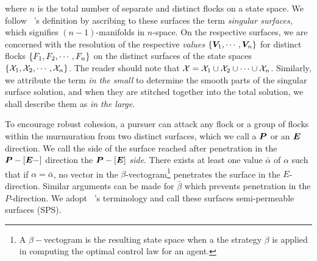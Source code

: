 %
where $n$ is the total number of separate and distinct flocks on a state space. We follow ~\cite{Isaacs1965}'s definition by ascribing to these surfaces the term \textit{singular surfaces}, which signifies $(n-1)$-manifolds in $n$-space.  On the respective surfaces, we are concerned with the resolution of the respective \textit{values} \ie  $\{\bm{V}_1, \cdots, \bm{V}_n\}$  for distinct flocks $\{F_1, F_2, \cdots, F_n\}$ on the distinct surfaces of the state spaces $\{\mathcal{X}_1, \mathcal{X}_2, \cdots, \mathcal{X}_n\}$. The reader should note that $\mathcal{X} = \mathcal{X}_1 \cup \mathcal{X}_2 \cup \cdots \cup \mathcal{X}_n$. %
Similarly, we  attribute the term \textit{in the small} to determine the smooth parts of the singular surface solution, and when they are stitched together into the total solution, we shall describe them as \textit{in the large}. 


To encourage robust cohesion, a pursuer can attack any flock or a group of flocks within the murmuration from two distinct surfaces, which we call a $\bm{P}$ or an $\bm{E}$ direction. We call the side of the surface reached after penetration in the $\bm{P}-[\bm{E}-]$ direction the $\bm{P}-[\bm{E}]$ \textit{side}. %
There exists at least one value $\bar{\alpha}$ of $\alpha$ such that if $\alpha = \bar{\alpha}$, no vector in the $\beta$-vectogram\footnote{A $\beta-$vectogram is the resulting state space when a the strategy $\beta$ is applied in computing the optimal control law for an agent.} penetrates the surface in the $E$-direction. Similar arguments can be made for $\bar{\beta}$ which prevents penetration in the $P$-direction. We adopt ~\cite{Isaacs1965}'s terminology and call these surfaces semi-permeable surfaces (SPS).



